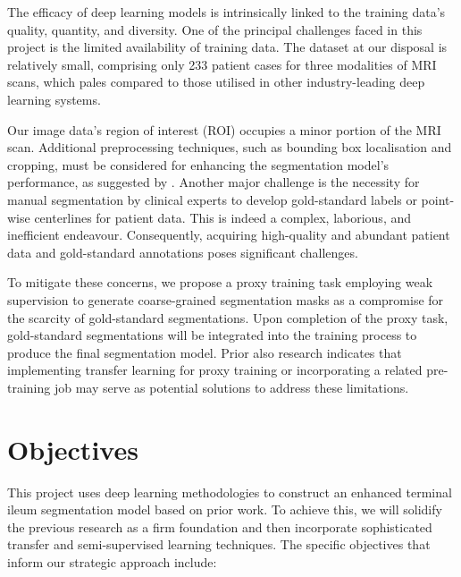 The efficacy of deep learning models is intrinsically linked to the training data's quality, quantity, and diversity. One of the principal challenges faced in this project is the limited availability of training data. The dataset at our disposal is relatively small, comprising only 233 patient cases for three modalities of MRI scans, which pales compared to those utilised in other industry-leading deep learning systems. 

Our image data's region of interest (ROI) occupies a minor portion of the MRI scan. Additional preprocessing techniques, such as bounding box localisation and cropping, must be considered for enhancing the segmentation model's performance, as suggested by \cite{Ali2022}. Another major challenge is the necessity for manual segmentation by clinical experts to develop gold-standard labels or point-wise centerlines for patient data. This is indeed a complex, laborious, and inefficient endeavour. Consequently, acquiring high-quality and abundant patient data and gold-standard annotations poses significant challenges.

To mitigate these concerns, we propose a proxy training task employing weak supervision to generate coarse-grained segmentation masks as a compromise for the scarcity of gold-standard segmentations. Upon completion of the proxy task, gold-standard segmentations will be integrated into the training process to produce the final segmentation model. Prior also research \cite{Ali2022} indicates that implementing transfer learning for proxy training \cite{jang2021effectiveness} or incorporating a related pre-training job may serve as potential solutions to address these limitations.

\section{Objectives}

This project uses deep learning methodologies to construct an enhanced terminal ileum segmentation model based on prior work. To achieve this, we will solidify the previous research as a firm foundation and then incorporate sophisticated transfer and semi-supervised learning techniques. The specific objectives that inform our strategic approach include:

